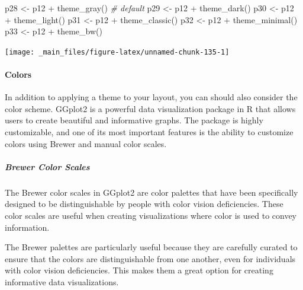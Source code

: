 \documentclass[
]{book}
\newenvironment{Shaded}{\begin{snugshade}}{\end{snugshade}}
\newcommand{\CommentTok}[1]{\textcolor[rgb]{0.56,0.35,0.01}{\textit{#1}}}
\newcommand{\FunctionTok}[1]{\textcolor[rgb]{0.00,0.00,0.00}{#1}}
\newcommand{\NormalTok}[1]{#1}
\newcommand{\OtherTok}[1]{\textcolor[rgb]{0.56,0.35,0.01}{#1}}
\newcommand{\SpecialCharTok}[1]{\textcolor[rgb]{0.00,0.00,0.00}{#1}}
\begin{document}
\begin{Shaded}
\begin{Highlighting}[]
\NormalTok{p28 }\OtherTok{\textless{}{-}}\NormalTok{ p12 }\SpecialCharTok{+} \FunctionTok{theme\_gray}\NormalTok{() }\CommentTok{\# default}
\NormalTok{p29 }\OtherTok{\textless{}{-}}\NormalTok{ p12 }\SpecialCharTok{+} \FunctionTok{theme\_dark}\NormalTok{()}
\NormalTok{p30 }\OtherTok{\textless{}{-}}\NormalTok{ p12 }\SpecialCharTok{+} \FunctionTok{theme\_light}\NormalTok{()}
\NormalTok{p31 }\OtherTok{\textless{}{-}}\NormalTok{ p12 }\SpecialCharTok{+} \FunctionTok{theme\_classic}\NormalTok{()}
\NormalTok{p32 }\OtherTok{\textless{}{-}}\NormalTok{ p12 }\SpecialCharTok{+} \FunctionTok{theme\_minimal}\NormalTok{()}
\NormalTok{p33 }\OtherTok{\textless{}{-}}\NormalTok{ p12 }\SpecialCharTok{+} \FunctionTok{theme\_bw}\NormalTok{()}
\end{Highlighting}
\end{Shaded}

\begin{center}\texttt{[image: \_main\_files/figure-latex/unnamed-chunk-135-1]} \end{center}

\hypertarget{colors-1}{%
\paragraph*{Colors}\label{colors-1}}

In addition to applying a theme to your layout, you can should also consider the color scheme. GGplot2 is a powerful data visualization package in R that allows users to create beautiful and informative graphs. The package is highly customizable, and one of its most important features is the ability to customize colors using Brewer and manual color scales.

\hypertarget{brewer-color-scales}{%
\subparagraph*{Brewer Color Scales}\label{brewer-color-scales}}

The Brewer color scales in GGplot2 are color palettes that have been specifically designed to be distinguishable by people with color vision deficiencies. These color scales are useful when creating visualizations where color is used to convey information.

The Brewer palettes are particularly useful because they are carefully curated to ensure that the colors are distinguishable from one another, even for individuals with color vision deficiencies. This makes them a great option for creating informative data visualizations.
\end{document}
